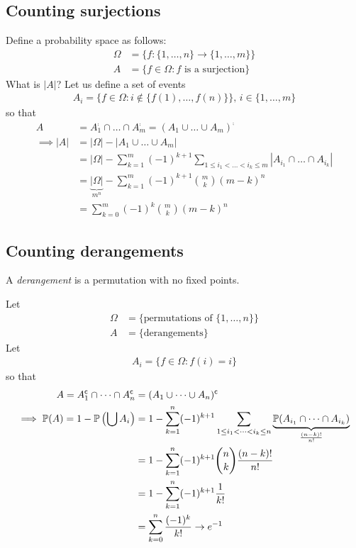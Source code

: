 \documentclass{../../template/note}
\begin{document}
    \subsection{Counting surjections}

    Define a probability space as follows:
    \begin{align*}
        \Omega &= \{f: \{1, \dots, n\} \to \{1, \dots, m\}\} \\
        A &= \{f \in \Omega: f \text{ is a surjection}\}
    \end{align*}
    What is \(| A| \)? Let us define a set of events
    \begin{align*}
        A_i = \{f \in \Omega: i \notin \{f(1), \dots, f(n)\}\}, \, i \in \{1, \dots, m\}
    \end{align*}
    so that
    \begin{align*}
        A &= A_1^\comp \cap \dots \cap A_m^\comp = (A_1 \cup \dots \cup A_m)^\comp \\
        \implies | A|  &= | \Omega|  - | A_1 \cup \dots \cup A_m|  \\
        &= | \Omega|  - \sum_{k=1}^m (-1)^{k+1} \sum_{1 \leq i_1 < \dots < i_k \leq m} | A_{i_1} \cap \dots \cap A_{i_k}|  \\
        &= \underbrace{| \Omega| }_{m^n} - \sum_{k=1}^m (-1)^{k+1} \binom{m}{k} (m-k)^n \\
        &= \sum_{k=0}^m (-1)^k \binom{m}{k} (m-k)^n
    \end{align*}
    

    \subsection{Counting derangements}

    \begin{definition}
        A \emph{derangement} is a permutation with no fixed points.
    \end{definition}
    Let
    \begin{align*}
        \Omega &= \{\text{permutations of } \{1, \dots, n\}\} \\
        A &= \{\text{derangements}\}
    \end{align*}
    Let
    \begin{align*}
        A_i = \{f \in \Omega: f(i) = i\}
    \end{align*}
    so that
    \begin{align*}
        A = A_1^{\mathsf{c}} \cap \dots \cap A_n^{\mathsf{c}} &= (A_1 \cup \dots \cup A_n)^{\mathsf{c}} \\
        \implies \mathbb P(A) = 1 - \mathbb P\left(\bigcup A_i\right) &= 1 - \sum_{k=1}^n (-1)^{k+1} \sum_{1 \leq i_1 < \dots < i_k \leq n} \underbrace{\mathbb P(A_{i_1} \cap \dots \cap A_{i_k})}_{\frac{(n-k)!}{n!}} \\
        &= 1 - \sum_{k=1}^n (-1)^{k+1} \binom n k \frac{(n-k)!}{n!} \\
        &= 1 - \sum_{k=1}^n (-1)^{k+1} \frac{1}{k!} \\
        &= \sum_{k=0}^n \frac{(-1)^k}{k!} \to e^{-1}
    \end{align*}
    
\end{document}
